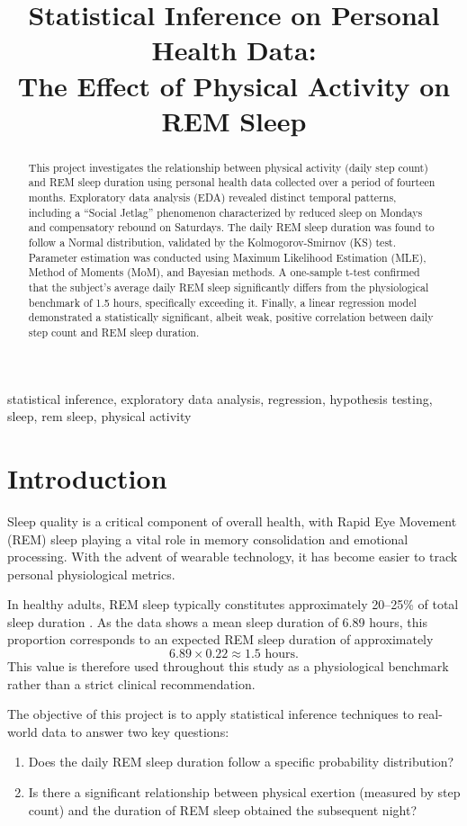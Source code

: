 \documentclass[conference]{IEEEtran}
\title{Statistical Inference on Personal Health Data:\\ The Effect of Physical Activity on REM Sleep}
\author{\IEEEauthorblockN{Yiğit Ateş}
\IEEEauthorblockA{\textit{Institute for Data Science \& Artificial Intelligence} \\
\textit{Boğaziçi University}\\
Istanbul, Turkey \\
2025776009}
}
\begin{document}
\maketitle

\begin{abstract}
This project investigates the relationship between physical activity (daily step count) and REM sleep duration using personal health data collected over a period of fourteen months. Exploratory data analysis (EDA) revealed distinct temporal patterns, including a ``Social Jetlag'' phenomenon characterized by reduced sleep on Mondays and compensatory rebound on Saturdays. The daily REM sleep duration was found to follow a Normal distribution, validated by the Kolmogorov-Smirnov (KS) test. Parameter estimation was conducted using Maximum Likelihood Estimation (MLE), Method of Moments (MoM), and Bayesian methods. A one-sample t-test confirmed that the subject's average daily REM sleep significantly differs from the physiological benchmark of 1.5 hours, specifically exceeding it. Finally, a linear regression model demonstrated a statistically significant, albeit weak, positive correlation between daily step count and REM sleep duration.
\end{abstract}

\begin{IEEEkeywords}
statistical inference, exploratory data analysis, regression, hypothesis testing, sleep, rem sleep, physical activity
\end{IEEEkeywords}

\section{Introduction}
Sleep quality is a critical component of overall health, with Rapid Eye Movement (REM) sleep playing a vital role in memory consolidation and emotional processing. With the advent of wearable technology, it has become easier to track personal physiological metrics.

In healthy adults, REM sleep typically constitutes approximately 20--25\% of total sleep duration \cite{carskadon2017sleep}. As the data shows a mean sleep duration of 6.89 hours, this proportion corresponds to an expected REM sleep duration of approximately
\[
6.89 \times 0.22 \approx 1.5 \text{ hours}.
\]
This value is therefore used throughout this study as a physiological benchmark rather than a strict clinical recommendation.

The objective of this project is to apply statistical inference techniques to real-world data to answer two key questions:
\begin{enumerate}
    \item Does the daily REM sleep duration follow a specific probability distribution?
    \item Is there a significant relationship between physical exertion (measured by step count) and the duration of REM sleep obtained the subsequent night?
\end{enumerate}
\end{document}

